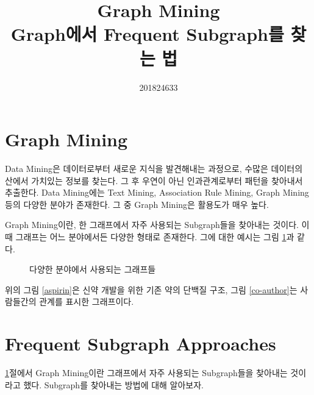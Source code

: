 \documentclass{oblivoir}
\title{Graph Mining \large \\
	Graph에서 Frequent Subgraph를 찾는 법}
\author{201824633}
\begin{document}
	\maketitle
	\section {Graph Mining}
		\label{graph_mining}
		Data Mining은 데이터로부터 새로운 지식을 발견해내는 과정으로, 수많은 데이터의 산에서 가치있는 정보를 찾는다. 그 후 우연이 아닌 인과관계로부터 패턴을 찾아내서 추출한다. Data Mining에는 Text Mining, Association Rule Mining, Graph Mining 등의 다양한 분야가 존재한다. 그 중 Graph Mining은 활용도가 매우 높다.
		
		 
		 Graph Mining이란, 한 그래프에서 자주 사용되는 Subgraph들을 찾아내는 것이다. 이 때 그래프는 어느 분야에서든 다양한 형태로 존재한다. 그에 대한 예시는 그림 \ref {graphs}과 같다. 
		\begin{figure}[h]
			\centering
			\quad %
			\caption{다양한 분야에서 사용되는 그래프들}
			\label{graphs}
		\end{figure}
		
		
		위의 그림 \ref {aspirin}은 신약 개발을 위한 기존 약의 단백질 구조, 그림 \ref{co-author}는 사람들간의 관계를 표시한 그래프이다.
	
	\section {Frequent Subgraph Approaches}
		\ref{graph_mining}절에서 Graph Mining이란 그래프에서 자주 사용되는 Subgraph들을 찾아내는 것이라고 했다.  Subgraph를 찾아내는 방법에 대해 알아보자.
		
\end{document}
